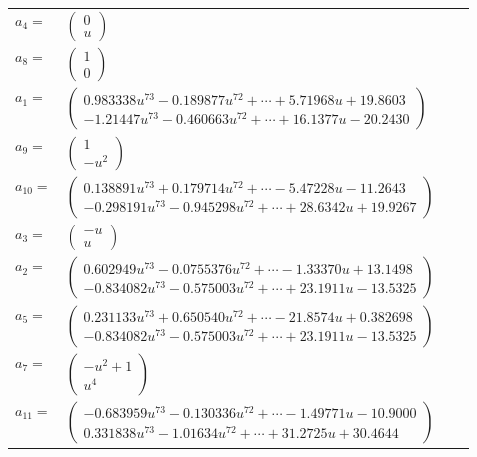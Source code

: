 \documentclass[1p]{elsarticle_modified}
\theoremstyle{definition}
\begin{document}
\begin{tabular}{m{7pt} m{180pt} m{7pt} m{180pt} }
\flushright $a_{4}=$&$\begin{pmatrix}0\\u\end{pmatrix}$ \\
\flushright $a_{8}=$&$\begin{pmatrix}1\\0\end{pmatrix}$ \\
\flushright $a_{1}=$&$\begin{pmatrix}0.983338 u^{73}-0.189877 u^{72}+\cdots+5.71968 u+19.8603\\-1.21447 u^{73}-0.460663 u^{72}+\cdots+16.1377 u-20.2430\end{pmatrix}$ \\
\flushright $a_{9}=$&$\begin{pmatrix}1\\- u^2\end{pmatrix}$ \\
\flushright $a_{10}=$&$\begin{pmatrix}0.138891 u^{73}+0.179714 u^{72}+\cdots-5.47228 u-11.2643\\-0.298191 u^{73}-0.945298 u^{72}+\cdots+28.6342 u+19.9267\end{pmatrix}$ \\
\flushright $a_{3}=$&$\begin{pmatrix}- u\\u\end{pmatrix}$ \\
\flushright $a_{2}=$&$\begin{pmatrix}0.602949 u^{73}-0.0755376 u^{72}+\cdots-1.33370 u+13.1498\\-0.834082 u^{73}-0.575003 u^{72}+\cdots+23.1911 u-13.5325\end{pmatrix}$ \\
\flushright $a_{5}=$&$\begin{pmatrix}0.231133 u^{73}+0.650540 u^{72}+\cdots-21.8574 u+0.382698\\-0.834082 u^{73}-0.575003 u^{72}+\cdots+23.1911 u-13.5325\end{pmatrix}$ \\
\flushright $a_{7}=$&$\begin{pmatrix}- u^2+1\\u^4\end{pmatrix}$ \\
\flushright $a_{11}=$&$\begin{pmatrix}-0.683959 u^{73}-0.130336 u^{72}+\cdots-1.49771 u-10.9000\\0.331838 u^{73}-1.01634 u^{72}+\cdots+31.2725 u+30.4644\end{pmatrix}$ \\

\end{tabular}
\end{document}
